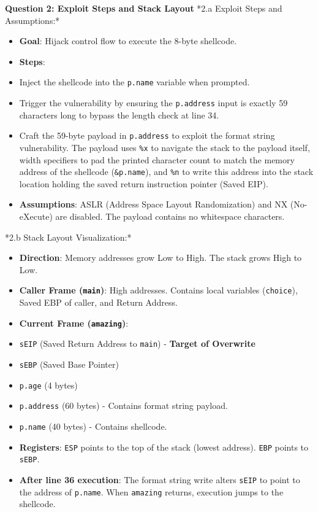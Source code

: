 \documentclass{article}
\begin{document}
\textbf{Question 2: Exploit Steps and Stack Layout}
*2.a Exploit Steps and Assumptions:*
\begin{itemize}
    \item \textbf{Goal}: Hijack control flow to execute the 8-byte shellcode.
    \item \textbf{Steps}:
    \item[\textbf{1.}] Inject the shellcode into the \texttt{p.name} variable when prompted.
    \item[\textbf{2.}] Trigger the vulnerability by ensuring the \texttt{p.address} input is exactly 59 characters long to bypass the length check at line 34.
    \item[\textbf{3.}] Craft the 59-byte payload in \texttt{p.address} to exploit the format string vulnerability. The payload uses \texttt{\%x} to navigate the stack to the payload itself, width specifiers to pad the printed character count to match the memory address of the shellcode (\texttt{\&p.name}), and \texttt{\%n} to write this address into the stack location holding the saved return instruction pointer (Saved EIP).
    \item \textbf{Assumptions}: ASLR (Address Space Layout Randomization) and NX (No-eXecute) are disabled. The payload contains no whitespace characters.

\end{itemize}
*2.b Stack Layout Visualization:*
\begin{itemize}
    \item \textbf{Direction}: Memory addresses grow Low to High. The stack grows High to Low.
    \item \textbf{Caller Frame (\texttt{main})}: High addresses. Contains local variables (\texttt{choice}), Saved EBP of caller, and Return Address.
    \item \textbf{Current Frame (\texttt{amazing})}:
    \item \texttt{sEIP} (Saved Return Address to \texttt{main}) - \textbf{Target of Overwrite}
    \item \texttt{sEBP} (Saved Base Pointer)
    \item \texttt{p.age} (4 bytes)
    \item \texttt{p.address} (60 bytes) - Contains format string payload.
    \item \texttt{p.name} (40 bytes) - Contains shellcode.
    \item \textbf{Registers}: \texttt{ESP} points to the top of the stack (lowest address). \texttt{EBP} points to \texttt{sEBP}.
    \item \textbf{After line 36 execution}: The format string write alters \texttt{sEIP} to point to the address of \texttt{p.name}. When \texttt{amazing} returns, execution jumps to the shellcode.

\end{itemize}
\end{document}
